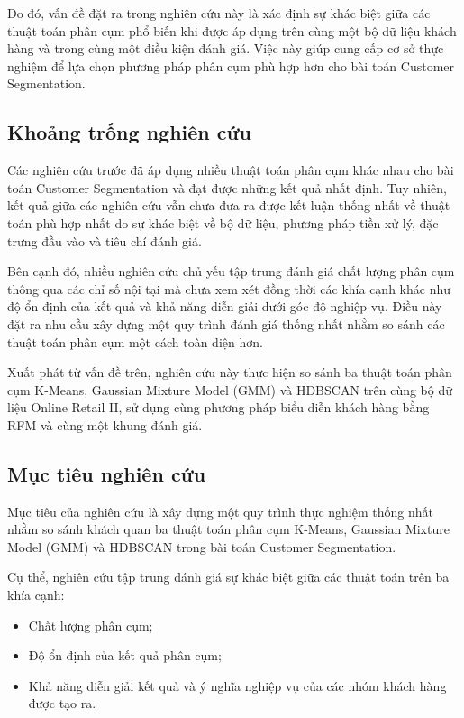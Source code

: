 \documentclass[12pt]{ai_conquer2026}
\begin{document}
Do đó, vấn đề đặt ra trong nghiên cứu này là xác định sự khác biệt giữa các thuật toán phân cụm phổ biến khi được áp dụng trên cùng một bộ dữ liệu khách hàng và trong cùng một điều kiện đánh giá. Việc này giúp cung cấp cơ sở thực nghiệm để lựa chọn phương pháp phân cụm phù hợp hơn cho bài toán Customer Segmentation.

\subsection{Khoảng trống nghiên cứu}

Các nghiên cứu trước đã áp dụng nhiều thuật toán phân cụm khác nhau cho bài toán Customer Segmentation và đạt được những kết quả nhất định. Tuy nhiên, kết quả giữa các nghiên cứu vẫn chưa đưa ra được kết luận thống nhất về thuật toán phù hợp nhất do sự khác biệt về bộ dữ liệu, phương pháp tiền xử lý, đặc trưng đầu vào và tiêu chí đánh giá.

Bên cạnh đó, nhiều nghiên cứu chủ yếu tập trung đánh giá chất lượng phân cụm thông qua các chỉ số nội tại mà chưa xem xét đồng thời các khía cạnh khác như độ ổn định của kết quả và khả năng diễn giải dưới góc độ nghiệp vụ. Điều này đặt ra nhu cầu xây dựng một quy trình đánh giá thống nhất nhằm so sánh các thuật toán phân cụm một cách toàn diện hơn.

Xuất phát từ vấn đề trên, nghiên cứu này thực hiện so sánh ba thuật toán phân cụm K-Means, Gaussian Mixture Model (GMM) và HDBSCAN trên cùng bộ dữ liệu Online Retail II, sử dụng cùng phương pháp biểu diễn khách hàng bằng RFM và cùng một khung đánh giá.

\subsection{Mục tiêu nghiên cứu}

Mục tiêu của nghiên cứu là xây dựng một quy trình thực nghiệm thống nhất nhằm so sánh khách quan ba thuật toán phân cụm K-Means, Gaussian Mixture Model (GMM) và HDBSCAN trong bài toán Customer Segmentation.

Cụ thể, nghiên cứu tập trung đánh giá sự khác biệt giữa các thuật toán trên ba khía cạnh:

\begin{itemize}
    \item Chất lượng phân cụm;
    \item Độ ổn định của kết quả phân cụm;
    \item Khả năng diễn giải kết quả và ý nghĩa nghiệp vụ của các nhóm khách hàng được tạo ra.
\end{itemize}
\end{document}
